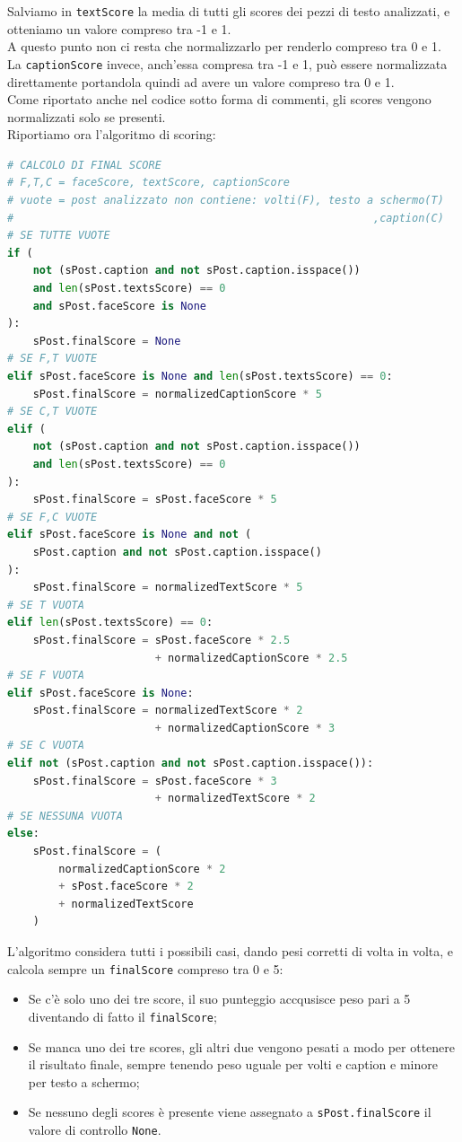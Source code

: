 Salviamo in \verb+textScore+ la media di tutti gli scores dei pezzi di testo analizzati, e otteniamo
un valore compreso tra -1 e 1.\\ 
A questo punto non ci resta che normalizzarlo per renderlo compreso tra 0 e 1.\\ 
La \verb+captionScore+ invece, anch'essa compresa tra -1 e 1, può essere normalizzata direttamente portandola
quindi ad avere un valore compreso tra 0 e 1.\\
Come riportato anche nel codice sotto forma di commenti, gli scores vengono normalizzati solo se presenti.\\
Riportiamo ora l'algoritmo di scoring:
\begin{lstlisting}[language=Python]
# CALCOLO DI FINAL SCORE
# F,T,C = faceScore, textScore, captionScore
# vuote = post analizzato non contiene: volti(F), testo a schermo(T)
#                                                        ,caption(C)
# SE TUTTE VUOTE
if (
    not (sPost.caption and not sPost.caption.isspace())
    and len(sPost.textsScore) == 0
    and sPost.faceScore is None
):
    sPost.finalScore = None
# SE F,T VUOTE
elif sPost.faceScore is None and len(sPost.textsScore) == 0:
    sPost.finalScore = normalizedCaptionScore * 5
# SE C,T VUOTE
elif (
    not (sPost.caption and not sPost.caption.isspace())
    and len(sPost.textsScore) == 0
):
    sPost.finalScore = sPost.faceScore * 5
# SE F,C VUOTE
elif sPost.faceScore is None and not (
    sPost.caption and not sPost.caption.isspace()
):
    sPost.finalScore = normalizedTextScore * 5
# SE T VUOTA
elif len(sPost.textsScore) == 0:
    sPost.finalScore = sPost.faceScore * 2.5 
                       + normalizedCaptionScore * 2.5
# SE F VUOTA
elif sPost.faceScore is None:
    sPost.finalScore = normalizedTextScore * 2 
                       + normalizedCaptionScore * 3
# SE C VUOTA
elif not (sPost.caption and not sPost.caption.isspace()):
    sPost.finalScore = sPost.faceScore * 3 
                       + normalizedTextScore * 2
# SE NESSUNA VUOTA
else:
    sPost.finalScore = (
        normalizedCaptionScore * 2 
        + sPost.faceScore * 2 
        + normalizedTextScore
    )
\end{lstlisting}
L'algoritmo considera tutti i possibili casi, dando pesi corretti di volta in volta, e calcola
sempre un \verb+finalScore+ compreso tra 0 e 5: 
\begin{itemize}
    \item Se c'è solo uno dei tre score, il suo punteggio accqusisce
    peso pari a 5 diventando di fatto il \verb+finalScore+;
    
    \item Se manca uno dei tre scores, gli altri due vengono
    pesati a modo per ottenere il risultato finale, sempre tenendo peso uguale 
    per volti e caption e minore per testo a schermo;
    
    \item Se nessuno degli scores è presente viene assegnato a \verb+sPost.finalScore+ 
    il valore di controllo \verb+None+.
\end{itemize}



